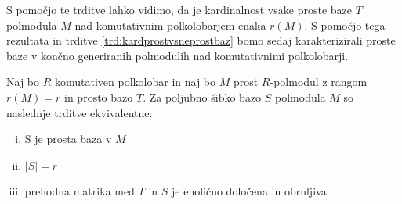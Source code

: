 \documentclass[mat1]{fmfdelo}
\newcommand{\abs}[1]{\ensuremath{\lvert #1 \rvert}}
\begin{document}
S pomočjo te trditve lahko vidimo, da je kardinalnost vsake proste baze $T$ polmodula $M$ nad komutativnim polkolobarjem enaka $r(M)$. S pomočjo tega rezultata in trditve \ref{trd:kardprostvsneprostbaz} bomo sedaj karakterizirali proste baze v končno generiranih polmodulih nad komutativnimi polkolobarji.

\begin{izrek}\label{izr:karakprostbaz}
Naj bo $R$ komutativen polkolobar in naj bo $M$ prost $R$-polmodul z rangom $r(M) = r$ in prosto bazo $T$. Za poljubno šibko bazo $S$ polmodula $M$ so naslednje trditve ekvivalentne: \begin{enumerate}[i.]
	\item\label{item:karakprostbaz1} S je prosta baza v $M$
	\item\label{item:karakprostbaz2} $\abs{S} = r$
	\item\label{item:karakprostbaz3} prehodna matrika med $T$ in $S$ je enolično določena in obrnljiva
\end{enumerate}
\end{izrek}
\end{document}
